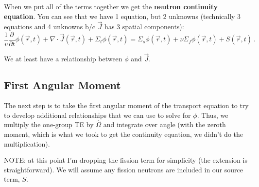 \documentclass[12pt]{article}
\newlength{\up}
\newcommand{\vOmega}{\ensuremath{\hat{\Omega}}}
\begin{document}
\vspace*{2em}
When we put all of the terms together we get the \textbf{neutron continuity equation}. You can see that we have 1 equation, but 2 unknowns (technically 3 equations and 4 unknowns b/c $\vec{J}$ has 3 spatial components):
\begin{equation}
\frac{1}{v}\frac{\partial}{\partial t}\phi(\vec{r}, t) + 
\nabla \cdot \vec{J}(\vec{r}, t) + 
\Sigma_t \phi(\vec{r}, t) =
\Sigma_s \phi(\vec{r}, t) +
\nu \Sigma_f \phi(\vec{r}, t) +
S(\vec{r}, t)\:.
\label{eq:neutroncont}
\end{equation}

We at least have a relationship between $\phi$ and $\vec{J}$.

\subsection*{First Angular Moment}

The next step is to take the first angular moment of the transport equation to try to develop additional relationships that we can use to solve for $\phi$. Thus, we multiply the one-group TE by $\vOmega$ and integrate over angle (with the zeroth moment, which is what we took to get the continuity equation, we didn't do the multiplication). 

NOTE: at this point I'm dropping the fission term for simplicity (the extension is straightforward). We will assume any fission neutrons are included in our source term, $S$. 
\end{document}
